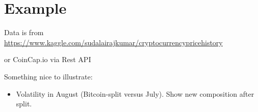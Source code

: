 \documentclass[11pt]{article}
\begin{document}
\section{Example}

Data is from \href{https://www.kaggle.com/sudalairajkumar/cryptocurrencypricehistory}{https://www.kaggle.com/sudalairajkumar/cryptocurrencypricehistory}

or CoinCap.io via Rest API

Something nice to illustrate:
\begin{itemize}
  \item Volatility in August (Bitcoin-split versus July). Show new composition after split.
\end{itemize}



\end{document}
